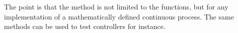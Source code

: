 The point is that the method is not limited to the functions, but for
any implementation of a mathematically defined continuous process. The
same methods can be used to test controllers for instance.

